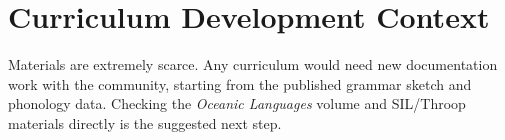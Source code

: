 \documentclass[12pt]{article}
\begin{document}
\section{Curriculum Development Context}
Materials are extremely scarce. Any curriculum would need new documentation work with the community, starting from the published grammar sketch and phonology data. Checking the \emph{Oceanic Languages} volume and SIL/Throop materials directly is the suggested next step.
\end{document}
